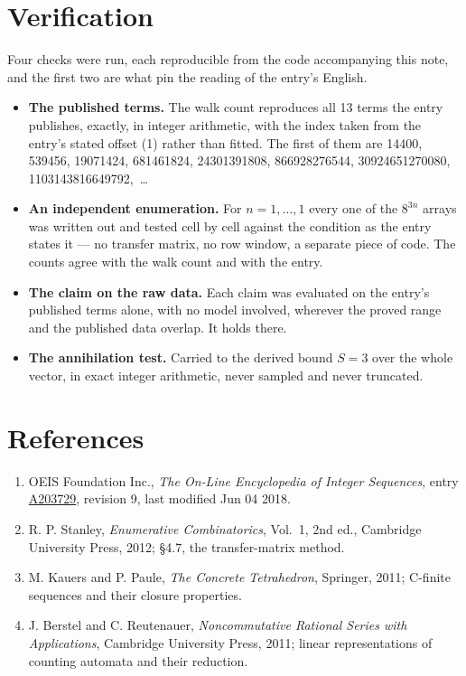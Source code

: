 \documentclass[11pt]{article}
\theoremstyle{definition}
\begin{document}
\section{Verification}

Four checks were run, each reproducible from the code accompanying this note, and the first two are what pin the reading of the entry's English.

\begin{itemize}

\item {\bfseries The published terms.} The walk count reproduces all 13 terms the entry publishes, exactly, in integer arithmetic, with the index taken from the entry's stated offset (1) rather than fitted. The first of them are 14400, 539456, 19071424, 681461824, 24301391808, 866928276544, 30924651270080, 1103143816649792,~\dots

\item {\bfseries An independent enumeration.} For $n = 1,\dots,1$ every one of the $8^{3n}$ arrays was written out and tested cell by cell against the condition as the entry states it --- no transfer matrix, no row window, a separate piece of code. The counts agree with the walk count and with the entry.

\item {\bfseries The claim on the raw data.} Each claim was evaluated on the entry's published terms alone, with no model involved, wherever the proved range and the published data overlap. It holds there.

\item {\bfseries The annihilation test.} Carried to the derived bound $S = 3$ over the whole vector, in exact integer arithmetic, never sampled and never truncated.

\end{itemize}

\section{References}

\begin{enumerate}

\item OEIS Foundation Inc., \emph{The On-Line Encyclopedia of Integer Sequences}, entry \href{https://oeis.org/A203729}{A203729}, revision 9, last modified Jun 04 2018.

\item R. P. Stanley, \emph{Enumerative Combinatorics}, Vol.~1, 2nd ed., Cambridge University Press, 2012; \S4.7, the transfer-matrix method.

\item M. Kauers and P. Paule, \emph{The Concrete Tetrahedron}, Springer, 2011; C-finite sequences and their closure properties.

\item J. Berstel and C. Reutenauer, \emph{Noncommutative Rational Series with Applications}, Cambridge University Press, 2011; linear representations of counting automata and their reduction.

\end{enumerate}
\end{document}
